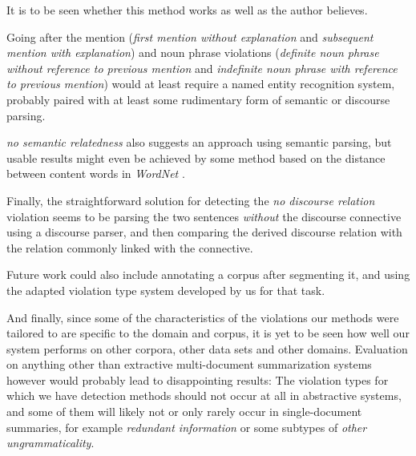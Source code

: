 \documentclass[a4paper,10pt]{scrartcl}
\theoremstyle{style}
\begin{document}
It is to be seen whether this method works as well as the author believes.


Going after the mention (\textit{first mention without explanation} and \textit{subsequent mention with explanation}) and noun phrase violations (\textit{definite noun phrase without reference to previous mention} and \textit{indefinite noun phrase with reference to previous mention}) would at least require a named entity recognition system, probably paired with at least some rudimentary form of semantic or discourse parsing.

\textit{no semantic relatedness} also suggests an approach using semantic parsing, but usable results might even be achieved by some method based on the distance between content words in \textit{WordNet} \citep{fellbaum2005wordnet}.

Finally, the straightforward solution for detecting the \textit{no discourse relation} violation seems to be parsing the two sentences \textit{without} the discourse connective using a discourse parser, and then comparing the derived discourse relation with the relation commonly linked with the connective.

Future work could also include annotating a corpus after segmenting it, and using the adapted violation type system developed by us for that task.

And finally, since some of the characteristics of the violations our methods were tailored to are specific to the domain and corpus, it is yet to be seen how well our system performs on other corpora, other data sets and other domains.
Evaluation on anything other than extractive multi-document summarization systems however would probably lead to disappointing results: The violation types for which we have detection methods should not occur at all in abstractive systems, and some of them will likely not or only rarely occur in single-document summaries, for example \textit{redundant information} or some subtypes of \textit{other ungrammaticality}.

\newpage


\end{document}
